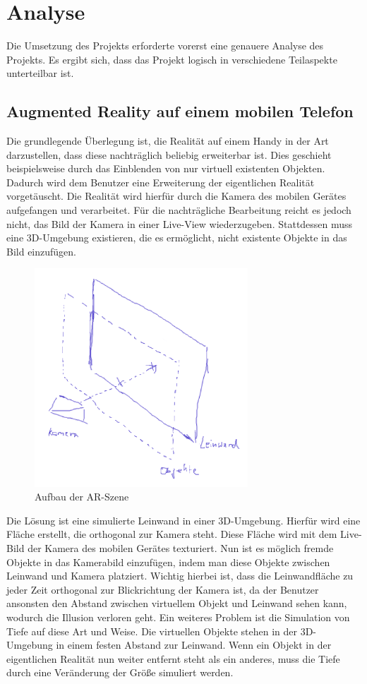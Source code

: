 \chapter{Analyse}
Die Umsetzung des Projekts erforderte vorerst eine genauere Analyse des Projekts. Es ergibt sich, dass das Projekt logisch in verschiedene Teilaspekte unterteilbar ist.

\section{Augmented Reality auf einem mobilen Telefon}
Die grundlegende Überlegung ist, die Realität auf einem Handy in der Art darzustellen, dass diese nachträglich beliebig erweiterbar ist. Dies geschieht beispielsweise durch das Einblenden von nur virtuell existenten Objekten. Dadurch wird dem Benutzer eine Erweiterung der eigentlichen Realität vorgetäuscht.
Die Realität wird hierfür durch die Kamera des mobilen Gerätes aufgefangen und verarbeitet. Für die nachträgliche Bearbeitung reicht es jedoch nicht, das Bild der Kamera in einer Live-View wiederzugeben. Stattdessen muss eine 3D-Umgebung existieren, die es ermöglicht, nicht existente Objekte in das Bild einzufügen.

\begin{figure}[!h]
  \centering
    \includegraphics[width=8cm]{szene_skizze}
    \caption{Aufbau der AR-Szene}
    \label{fig:scene_sketch}
\end{figure}

Die Lösung ist eine simulierte Leinwand in einer 3D-Umgebung. Hierfür wird eine Fläche erstellt, die orthogonal zur Kamera steht. Diese Fläche wird mit dem Live-Bild der Kamera des mobilen Gerätes texturiert. Nun ist es möglich fremde Objekte in das Kamerabild einzufügen, indem man diese Objekte zwischen Leinwand und Kamera platziert.
Wichtig hierbei ist, dass die Leinwandfläche zu jeder Zeit orthogonal zur Blickrichtung der Kamera ist, da der Benutzer ansonsten den Abstand zwischen virtuellem Objekt und Leinwand sehen kann, wodurch die Illusion verloren geht. Ein weiteres Problem ist die Simulation von Tiefe auf diese Art und Weise. Die virtuellen Objekte stehen in der 3D-Umgebung in einem festen Abstand zur Leinwand. Wenn ein Objekt in der eigentlichen Realität nun weiter entfernt steht als ein anderes, muss die Tiefe durch eine Veränderung der Größe simuliert werden.

